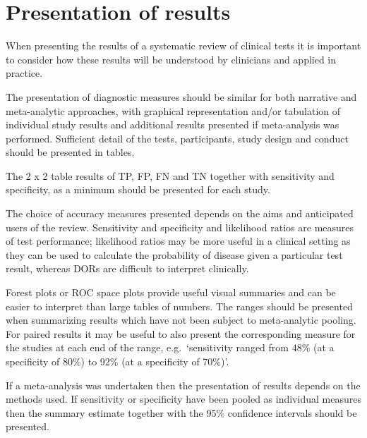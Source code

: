 \documentclass[
  11pt,
  a4paper,
  DIV=11,
  numbers=noendperiod]{scrreprt}
\begin{document}
\section{Presentation of results}\label{presentation-of-results}

When presenting the results of a systematic review of clinical tests it
is important to consider how these results will be understood by
clinicians and applied in practice.

The presentation of diagnostic measures should be similar for both
narrative and meta-analytic approaches, with graphical representation
and/or tabulation of individual study results and additional results
presented if meta-analysis was performed. Sufficient detail of the
tests, participants, study design and conduct should be presented in
tables.

The 2 x 2 table results of TP, FP, FN and TN together with sensitivity
and specificity, as a minimum should be presented for each study.

The choice of accuracy measures presented depends on the aims and
anticipated users of the review. Sensitivity and specificity and
likelihood ratios are measures of test performance; likelihood ratios
may be more useful in a clinical setting as they can be used to
calculate the probability of disease given a particular test result,
whereas DORs are difficult to interpret clinically.

Forest plots or ROC space plots provide useful visual summaries and can
be easier to interpret than large tables of numbers. The ranges should
be presented when summarizing results which have not been subject to
meta-analytic pooling. For paired results it may be useful to also
present the corresponding measure for the studies at each end of the
range, e.g.~`sensitivity ranged from 48\% (at a specificity of 80\%) to
92\% (at a specificity of 70\%)'.

If a meta-analysis was undertaken then the presentation of results
depends on the methods used. If sensitivity or specificity have been
pooled as individual measures then the summary estimate together with
the 95\% confidence intervals should be presented.
\end{document}
